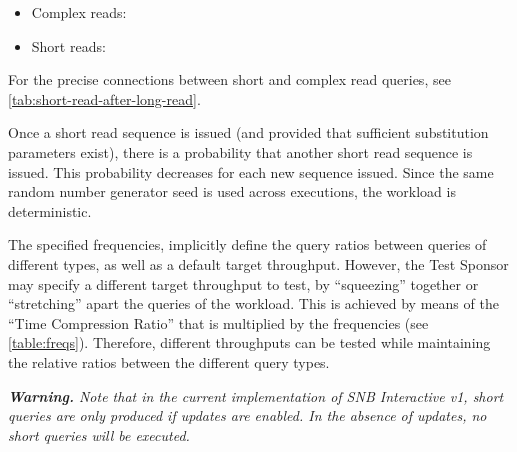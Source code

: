 \begin{itemize}
\item Complex reads:
\item Short reads:
\end{itemize}

For the precise connections between short and complex read queries, see \autoref{tab:short-read-after-long-read}.

Once a short read sequence is issued (and provided that sufficient substitution parameters 
exist), there is a probability that another short read sequence is issued. 
This probability decreases for each new sequence issued. 
Since the same random number generator seed is used across
executions, the workload is deterministic.



The specified frequencies, implicitly define the query ratios between queries
of different types, as well as a default target throughput. However, the Test
Sponsor may specify a different target throughput to test,  by ``squeezing''
together or ``stretching'' apart the queries of the workload. This is
achieved by means of the ``Time Compression Ratio'' that is multiplied by the
frequencies (see \autoref{table:freqs}).  Therefore, different
throughputs can be tested while maintaining the relative ratios between the
different query types.

\emph{\textbf{Warning.} Note that in the current implementation of SNB Interactive v1, short queries are only produced if updates are enabled. In the absence of updates, no short queries will be executed.}
